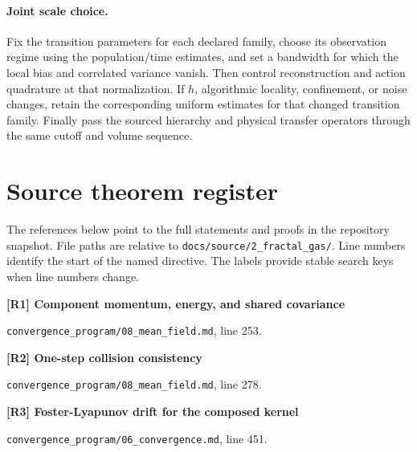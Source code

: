 \documentclass[11pt,a4paper]{article}
\begin{document}
\paragraph{Joint scale choice.}
Fix the transition parameters for each declared family, choose its observation regime using the population/time estimates, and set a bandwidth for which the local bias and correlated variance vanish. Then control reconstruction and action quadrature at that normalization. If \(h\), algorithmic locality, confinement, or noise changes, retain the corresponding uniform estimates for that changed transition family. Finally pass the sourced hierarchy and physical transfer operators through the same cutoff and volume sequence.

\clearpage
\appendix
\section{Source theorem register}
The references below point to the full statements and proofs in the repository snapshot. File paths are relative to \texttt{docs/source/2\_fractal\_gas/}. Line numbers identify the start of the named directive. The labels provide stable search keys when line numbers change.

\par\medskip\noindent\begin{minipage}{\linewidth}\textbf{[R1] Component momentum, energy, and shared covariance}\label{src:thm-mean-field-component-identities}\par
{\small\texttt{}\par
\nolinkurl{convergence_program/08_mean_field.md}, line 253.\par}
\end{minipage}\par

\par\medskip\noindent\begin{minipage}{\linewidth}\textbf{[R2] One-step collision consistency}\label{src:thm-mean-field-one-step-consistency}\par
{\small\texttt{}\par
\nolinkurl{convergence_program/08_mean_field.md}, line 278.\par}
\end{minipage}\par

\par\medskip\noindent\begin{minipage}{\linewidth}\textbf{[R3] Foster-Lyapunov drift for the composed kernel}\label{src:thm-foster-lyapunov-main}\par
{\small\texttt{}\par
\nolinkurl{convergence_program/06_convergence.md}, line 451.\par}
\end{minipage}\par
\end{document}
